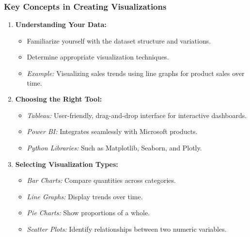 \documentclass[aspectratio=169]{beamer}
\begin{document}
\begin{frame}
    \frametitle{Key Concepts in Creating Visualizations}

    \begin{enumerate}
        \item \textbf{Understanding Your Data:}
            \begin{itemize}
                \item Familiarize yourself with the dataset structure and variations.
                \item Determine appropriate visualization techniques.
                \item \textit{Example:} Visualizing sales trends using line graphs for product sales over time.
            \end{itemize}

        \item \textbf{Choosing the Right Tool:}
            \begin{itemize}
                \item \textit{Tableau:} User-friendly, drag-and-drop interface for interactive dashboards.
                \item \textit{Power BI:} Integrates seamlessly with Microsoft products.
                \item \textit{Python Libraries:} Such as Matplotlib, Seaborn, and Plotly.
            \end{itemize}

        \item \textbf{Selecting Visualization Types:}
            \begin{itemize}
                \item \textit{Bar Charts:} Compare quantities across categories.
                \item \textit{Line Graphs:} Display trends over time.
                \item \textit{Pie Charts:} Show proportions of a whole.
                \item \textit{Scatter Plots:} Identify relationships between two numeric variables.
            \end{itemize}
    \end{enumerate}
\end{frame}
\end{document}
